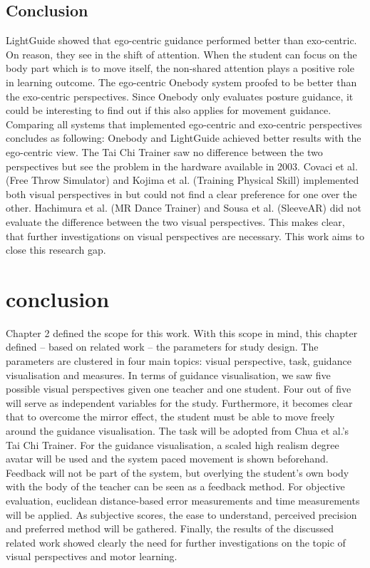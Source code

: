 \subsection{Conclusion}
LightGuide showed that ego-centric guidance performed better than exo-centric. On reason, they see in the shift of attention. When the student can focus on the body part which is to move itself, the non-shared attention plays a positive role in learning outcome. The ego-centric Onebody system proofed to be better than the exo-centric perspectives. Since Onebody only evaluates posture guidance, it could be interesting to find out if this also applies for movement guidance. Comparing all systems that implemented ego-centric and exo-centric perspectives concludes as following: Onebody and LightGuide achieved better results with the ego-centric view. The Tai Chi Trainer saw no difference between the two perspectives but see the problem in the hardware available in 2003. Covaci et al. (Free Throw Simulator) \cite{Covaci2014} and Kojima et al. (Training Physical Skill) \cite{Kojima2014} implemented both visual perspectives in but could not find a clear preference for one over the other. Hachimura et al. (MR Dance Trainer) \cite{Hachimura2004} and Sousa et al. (SleeveAR) \cite{Sousa2016} did not evaluate the difference between the two visual perspectives. This makes clear, that further investigations on visual perspectives are necessary. This work aims to close this research gap.

\section{conclusion}
Chapter 2 defined the scope for this work. With this scope in mind, this chapter defined \--- based on related work \--- the parameters for study design. The parameters are clustered in four main topics: visual perspective, task, guidance visualisation and measures. In terms of guidance visualisation, we saw five possible visual perspectives given one teacher and one student. Four out of five will serve as independent variables for the study. Furthermore, it becomes clear that to overcome the mirror effect, the student must be able to move freely around the guidance visualisation. The task will be adopted from Chua et al.'s Tai Chi Trainer. For the guidance visualisation, a scaled high realism degree avatar will be used and the system paced movement is shown beforehand. Feedback will not be part of the system, but overlying the student's own body with the body of the teacher can be seen as a feedback method. For objective evaluation, euclidean distance-based error measurements and time measurements will be applied. As subjective scores, the ease to understand, perceived precision and preferred method will be gathered. Finally, the results of the discussed related work showed clearly the need for further investigations on the topic of visual perspectives and motor learning.


